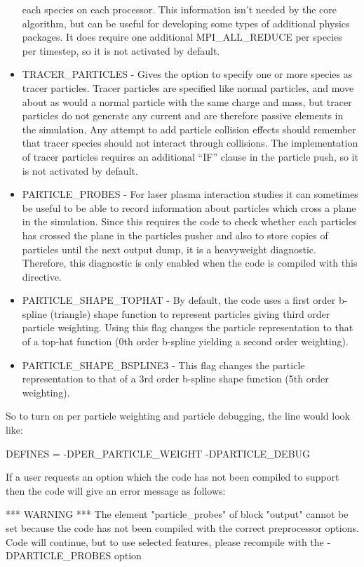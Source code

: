 \begin{itemize}
  each species on each processor. This information isn't needed by the core
  algorithm, but can be useful for developing some types of additional physics
  packages. It does require one additional MPI\_ALL\_REDUCE per species per
  timestep, so it is not activated by default.
\item TRACER\_PARTICLES - Gives the option to specify one or more species as
  tracer particles. Tracer particles are specified like normal particles, and
  move about as would a normal particle with the same charge and mass, but
  tracer particles do not generate any current and are therefore passive
  elements in the simulation. Any attempt to add particle collision effects
  should remember that tracer species should not interact through collisions.
  The implementation of tracer particles requires an additional ``IF'' clause
  in the particle push, so it is not activated by default.
\item PARTICLE\_PROBES - For laser plasma interaction studies it can sometimes
  be useful to be able to record information about particles which cross a
  plane in the simulation. Since this requires the code to check whether each
  particles has crossed the plane in the particles pusher and also to store
  copies of particles until the next output dump, it is a heavyweight
  diagnostic. Therefore, this diagnostic is only enabled when the code is
  compiled with this directive.
\item PARTICLE\_SHAPE\_TOPHAT - By default, the code uses a first order
  b-spline (triangle) shape function to represent particles giving
  third order particle weighting.
  Using this flag changes the particle representation to that of a top-hat
  function (0th order b-spline yielding a second order weighting).
\item PARTICLE\_SHAPE\_BSPLINE3 - This flag changes the particle representation
  to that of a 3rd order b-spline shape function (5th order weighting).
\end{itemize}

So to turn on per particle weighting and particle debugging, the line would
look like:
\begin{boxverbatim}
DEFINES = -DPER_PARTICLE_WEIGHT -DPARTICLE_DEBUG
\end{boxverbatim}

If a user requests an option which the code has not been compiled to support
then the code will give an error message as follows:
\begin{boxverbatim}
 *** WARNING ***
 The element "particle_probes" of block "output" cannot be set
 because the code has not been compiled with the correct preprocessor options.
 Code will continue, but to use selected features, please recompile with the
 -DPARTICLE_PROBES option
\end{boxverbatim}

